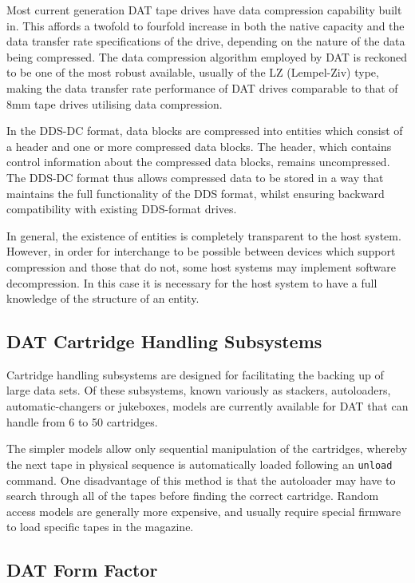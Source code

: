 Most current generation DAT tape drives have data compression capability
built in. This affords a twofold to fourfold increase in both the native
capacity and the data transfer rate specifications of the drive, depending
on the nature of the data being compressed. The data compression algorithm
employed by DAT is reckoned to be one of the most robust available, usually
of the LZ (Lempel-Ziv) type, making the data transfer rate performance of
DAT drives comparable to that of 8mm tape drives utilising data compression.

In the DDS-DC format, data blocks are compressed into entities which consist
of a header and one or more compressed data blocks. The header, which
contains control information about the compressed data blocks, remains
uncompressed. The DDS-DC format thus allows compressed data to be stored in
a way that maintains the full functionality of the DDS format, whilst
ensuring backward compatibility with existing DDS-format drives.

In general, the existence of entities is completely transparent to the host
system. However, in order for interchange to be possible between devices
which support compression and those that do not, some host systems may
implement software decompression. In this case it is necessary for the host
system to have a full knowledge of the structure of an entity.

\subsection {DAT Cartridge Handling Subsystems}

Cartridge handling subsystems are designed for facilitating the backing up
of large data sets. Of these subsystems, known variously as stackers,
autoloaders, automatic-changers or jukeboxes, models are currently available
for DAT that can handle from 6 to 50 cartridges.

The simpler models allow only sequential manipulation of the cartridges,
whereby the next tape in physical sequence is automatically loaded following
an {\tt unload} command. One disadvantage of this method is that the autoloader
may have to search through all of the tapes before finding the correct
cartridge. Random access models are generally more expensive, and usually
require special firmware to load specific tapes in the magazine.

\subsection {DAT Form Factor}

